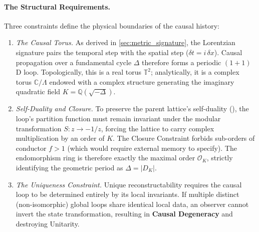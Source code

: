 \paragraph{The Structural Requirements.} Three constraints define the physical boundaries of the causal history:
\begin{enumerate}
    \item[\textbf{(R1)}] \emph{The Causal Torus.} As derived in \cref{sec:metric_signature}, the Lorentzian signature pairs the temporal step with the spatial step ($\delta t = i\,\delta x$). Causal propagation over a fundamental cycle $\Delta$ therefore forms a periodic $(1+1)$D loop. Topologically, this is a real torus $\mathbb{T}^2$; analytically, it is a complex torus $\mathbb{C}/\Lambda$ endowed with a complex structure generating the imaginary quadratic field $K = \mathbb{Q}(\sqrt{-\Delta})$.
    
    \item[\textbf{(R2)}] \emph{Self-Duality and Closure.} To preserve the parent lattice's self-duality (), the loop's partition function must remain invariant under the modular transformation $S: z \to -1/z$, forcing the lattice to carry complex multiplication by an order of $K$. The Closure Constraint forbids sub-orders of conductor $f>1$ (which would require external memory to specify). The endomorphism ring is therefore exactly the maximal order $\mathcal{O}_K$, strictly identifying the geometric period as $\Delta = |D_K|$.
    
    \item[\textbf{(R3)}] \emph{The Uniqueness Constraint.} Unique reconstructability requires the causal loop to be determined entirely by its local invariants. If multiple distinct (non-isomorphic) global loops share identical local data, an observer cannot invert the state transformation, resulting in \textbf{Causal Degeneracy} and destroying Unitarity.
\end{enumerate}

